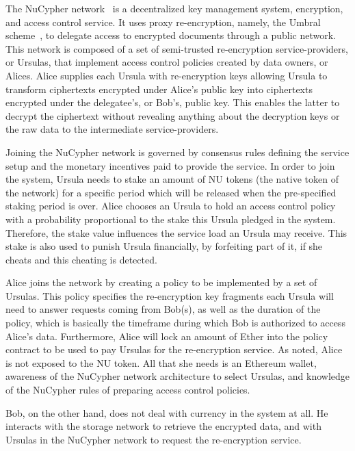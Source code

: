 \documentclass{llncs}
\begin{document}
 The NuCypher network~\cite{nucypher,egorov2017nucypher} is a decentralized key management
system, encryption, and access control service. It uses proxy re-encryption, namely, the
Umbral scheme~\cite{umbral2018}, to delegate access to encrypted
documents through a public network. This network is composed of a set of semi-trusted
re-encryption service-providers, or Ursulas, that implement access control policies created by data
owners, or Alices. Alice supplies each Ursula with re-encryption keys allowing Ursula to transform
ciphertexts encrypted under Alice's public key into ciphertexts encrypted under the delegatee's, or Bob's,
public key. This enables the latter to decrypt the ciphertext without revealing anything about the
decryption keys or the raw data to the intermediate service-providers.


Joining the NuCypher network is governed by consensus rules defining the service setup
and the monetary incentives paid to provide the service. In order to join the 
system, Ursula needs to stake an amount of NU tokens (the native token of the network) for a specific period
which will be released when the pre-specified staking period is over. Alice chooses an
Ursula to hold an access control policy with a probability proportional to the stake this Ursula 
pledged in the system. Therefore, the stake value influences the service load an Ursula
may receive. This stake is also used to punish Ursula financially, by forfeiting part
of it, if she cheats and this cheating is detected. 


Alice joins the network by creating a policy to be implemented by a 
set of Ursulas. This policy specifies the re-encryption key fragments each Ursula will
need to answer requests coming from Bob(s), as well as the duration of the policy, which 
is basically the timeframe during which Bob is authorized to access Alice's data.  Furthermore,
Alice will lock an amount of Ether into the policy contract to be used to pay Ursulas for the re-encryption 
service. As noted, Alice is not exposed to the NU token. All that she needs is an Ethereum
wallet, awareness of the NuCypher network architecture to select Ursulas, and knowledge of the
NuCypher rules of preparing access control policies.


Bob, on the other hand, does not deal with currency in the system at all. He interacts with the storage 
network to retrieve the encrypted data, and with Ursulas in the NuCypher network to request the
re-encryption service. \\
\end{document}
